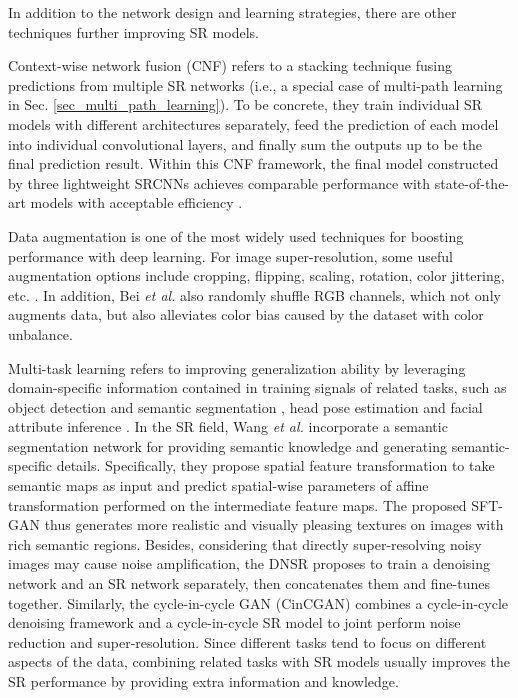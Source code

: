 {\label{sec_other_improvements}
In addition to the network design and learning strategies, there are other techniques further improving SR models.

Context-wise network fusion (CNF)  refers to a stacking technique fusing predictions from multiple SR networks (i.e., a special case of multi-path learning in Sec. \ref{sec_multi_path_learning}).
To be concrete, they train individual SR models with different architectures separately, feed the prediction of each model into individual convolutional layers, and finally sum the outputs up to be the final prediction result.
Within this CNF framework, the final model constructed by three lightweight SRCNNs  achieves comparable performance with state-of-the-art models with acceptable efficiency .

Data augmentation is one of the most widely used techniques for boosting performance with deep learning.
For image super-resolution, some useful augmentation options include cropping, flipping, scaling, rotation, color jittering, etc. .
In addition, Bei \textit{et al.}  also randomly shuffle RGB channels, which not only augments data, but also alleviates color bias caused by the dataset with color unbalance.

\label{sec_mtl}
Multi-task learning  refers to improving generalization ability by leveraging domain-specific information contained in training signals of related tasks, such as object detection and semantic segmentation , head pose estimation and facial attribute inference .
In the SR field, Wang \textit{et al.}  incorporate a semantic segmentation network for providing semantic knowledge and generating semantic-specific details.  
Specifically, they propose spatial feature transformation to take semantic maps as input and predict spatial-wise parameters of affine transformation performed on the intermediate feature maps.
The proposed SFT-GAN thus generates more realistic and visually pleasing textures on images with rich semantic regions.  
Besides, considering that directly super-resolving noisy images may cause noise amplification, the DNSR  proposes to train a denoising network and an SR network separately, then concatenates them and fine-tunes together.
Similarly, the cycle-in-cycle GAN (CinCGAN)  combines a cycle-in-cycle denoising framework and a cycle-in-cycle SR model to joint perform noise reduction and super-resolution.
Since different tasks tend to focus on different aspects of the data, combining related tasks with SR models usually improves the SR performance by providing extra information and knowledge.

}
